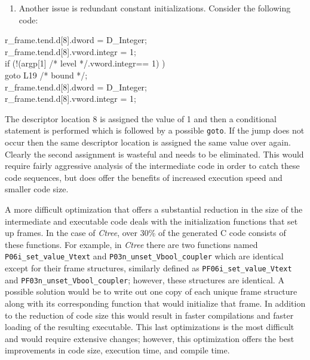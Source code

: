 \liststyleLxlii
\begin{enumerate}
\item 
Another issue is redundant constant initializations. Consider the following code:
\end{enumerate}
\goodbreak
\begin{iconcode}
r\_frame.tend.d[8].dword = D\_Integer;\\
r\_frame.tend.d[8].vword.integr = 1;\\
if (!(argp[1] /* level */.vword.integr== 1) )\\
\>goto L19 /* bound */;\\
r\_frame.tend.d[8].dword = D\_Integer;\\
r\_frame.tend.d[8].vword.integr = 1;\\
\end{iconcode}


The descriptor location 8 is assigned the value of 1 and then a
conditional statement is performed which is followed by a possible
\texttt{goto}. If the jump does not occur then the same descriptor
location is assigned the same value over again. Clearly the second
assignment is wasteful and needs to be eliminated. This would
require fairly aggressive analysis of the intermediate code in order
to catch these code sequences, but does offer the benefits of
increased execution speed and smaller code size.


A more difficult optimization that offers a substantial reduction in
the size of the intermediate and executable code deals with the
initialization functions that set up frames. In the case of
\textit{Ctree}, over 30\% of the generated C code consists of these
functions. For example, in \textit{Ctree} there are two functions
named \texttt{P06i\_set\_value\_Vtext} and
\texttt{P03n\_unset\_Vbool\_coupler} which are identical except for
their frame structures, similarly defined as
\texttt{PF06i\_set\_value\_Vtext} and
\texttt{PF03n\_unset\_Vbool\_coupler}; however, these structures are
identical. A possible solution would be to write out one copy of each
unique frame structure along with its corresponding function that
would initialize that frame. In addition to the reduction of code size
this would result in faster compilations and faster loading of the
resulting executable. This last optimizations is the most difficult
and would require extensive changes; however, this optimization offers
the best improvements in code size, execution time, and compile time.

